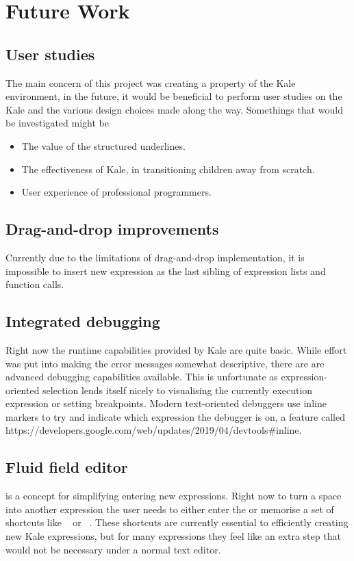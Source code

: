 \section{Future Work}

\subsection{User studies}
The main concern of this project was creating a property of the Kale
environment, in the future, it would be beneficial to perform user studies on
the Kale and the various design choices made along the way. Somethings that
would be investigated might be

\begin{itemize}[noitemsep]
	\item The value of the structured underlines.
	\item The effectiveness of Kale, in transitioning children away from scratch.
	\item User experience of professional programmers.
\end{itemize}

\subsection{Drag-and-drop improvements}
Currently due to the limitations of drag-and-drop implementation, it is
impossible to insert new expression as the last sibling of expression lists
and function calls.

\subsection{Integrated debugging}
Right now the runtime capabilities provided by Kale are quite basic. While
effort was put into making the error messages somewhat descriptive, there are 
are advanced debugging capabilities available. This is unfortunate as
expression-oriented selection lends itself nicely to visualising the currently
execution expression or setting breakpoints. Modern text-oriented debuggers use
inline markers to try and indicate which expression the debugger is on, a
feature called 
{https://developers.google.com/web/updates/2019/04/devtools\#inline}.

\subsection{Fluid field editor}
 is a concept for simplifying entering new expressions. Right
now to turn a space into another expression the user needs to either enter the
\hyperref[soln:space_popover]{} or memorise a set of
shortcuts like
\hyperref[cmd:make_var]{}~ or
\hyperref[cmd:make_var]{}~.
These shortcuts are currently essential to efficiently creating new Kale
expressions, but for many expressions they feel like an extra step that would
not be necessary under a normal text editor.

